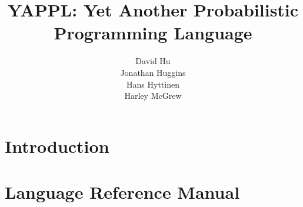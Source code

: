 \documentclass[11pt]{article}
\begin{document}
\setcounter{secnumdepth}{5}


\title{YAPPL: Yet Another Probabilistic Programming Language}
\author{  David Hu \\ Jonathan Huggins \\ Hans Hyttinen  \\ Harley McGrew}

\maketitle

\fancyhead{}
\fancyhead[L]{}
\fancyhead[R]{}

\newpage

\tableofcontents

\newpage

\section{Introduction}



\newpage

\section{Language Reference Manual}


\end{document}
